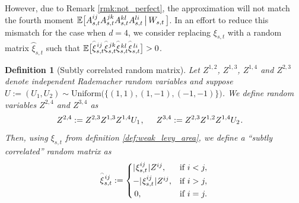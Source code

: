 \documentclass[sn-mathphys-num]{sn-jnl}%
\newtheorem{definition}{Definition}%
\newcommand{\E}{\mathbb{E}}
\newcommand{\m}{\hspace{0.25mm}}
\begin{document}
However, due to Remark \ref{rmk:not_perfect}, the approximation will not match the fourth moment $\E\big[A_{s,t}^{ij}A_{s,t}^{\m jk}A_{s,t}^{kl}A_{s,t}^{li}\,\big|\, W_{s,t}\,\big]$. In an effort to reduce this mismatch for the case when $d=4$, we consider replacing $\xi_{s,t}$ with a random matrix $\wideparen{\xi}_{s,t}$ such that $\E\big[\wideparen{\xi}_{s,t}^{\m ij}\wideparen{\xi}_{s,t}^{\m jk}\wideparen{\xi}_{s,t}^{\m kl}\wideparen{\xi}_{s,t}^{\, li}\big] > 0$.\medbreak

\begin{definition}[Subtly correlated random matrix]\label{def:subtle_random}
Let $Z^{1,2}$, $Z^{1,3}$, $Z^{1,4}$ and $Z^{2,3}$ denote independent Rademacher random variables and suppose $U := (U_1, U_2) \sim \mathrm{Uniform}\big(\{(1,1), (1,-1), (-1,-1)\}\big)$. We define random variables $Z^{2,4}$ and $Z^{3,4}$ as
\begin{align*}
Z^{2,4} & := Z^{2,3}Z^{1,3}Z^{1,4} U_1\m,\hspace{5mm}Z^{3,4} := Z^{2,3}Z^{1,2}Z^{1,4} U_2\m.
\end{align*}
Then, using $\xi_{s,t}$ from definition \ref{def:weak_levy_area}, we define a ``subtly correlated'' random matrix as
\begin{align*}
\wideparen{\xi}_{s,t}^{\m ij} := \begin{cases} |\m\xi_{s,t}^{ij}\m| Z^{ij}, & \text{if }i < j,\\[2pt]
-|\m\xi_{s,t}^{ij}\m| Z^{ij}, & \text{if }i > j,\\[1pt]
\,0, & \text{if }i = j.
\end{cases}
\end{align*}
\end{definition}
\end{document}
